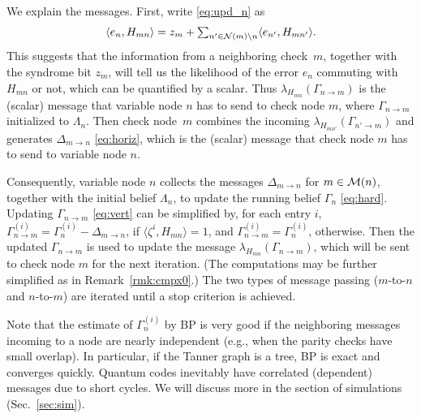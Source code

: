 \documentclass{ieeeaccess}
\newcommand{\sM}{{\cal M}}
\newcommand{\sN}{{\cal N}}
\theoremstyle{definition}		%
\begin{document}




We explain the messages. 
First, write \eqref{eq:upd_n} as
%
\begin{align*}	%
\langle e_n, H_{mn} \rangle = z_m + \textstyle \sum_{n'\in\sN(m)\setminus n} \langle e_{n'}, H_{mn'} \rangle.  %
\end{align*}
%
This suggests that the information from a neighboring check~$m$,  %
together with the syndrome bit $z_m$, will tell us the likelihood of the error $e_n$ commuting with $H_{mn}$ or not, which can be quantified by a scalar. 
Thus $\lambda_{H_{mn}}(\Gamma_{n\to m})$ is the (scalar) message that variable node $n$ has to send to check node $m$, where $\Gamma_{n\to m}$ initialized to $\Lambda_n$. 
Then check node~$m$ combines the incoming $\lambda_{H_{mn'}}(\Gamma_{n'\to m})$ and generates $\Delta_{m\to n}$ \eqref{eq:horiz}, which is the (scalar) message that check node $m$ has to send to variable node $n$.

Consequently,  variable node $n$ collects the messages $\Delta_{m\to n}$  for $m\in\sM(n)$, 
	together with the initial belief $\Lambda_n$, to update the running belief $\Gamma_{n}$ \eqref{eq:hard}. 
Updating $\Gamma_{n\to m}$ \eqref{eq:vert} can be simplified by, for each entry $i$, 
$\Gamma_{n\to m}^{(i)}=  \Gamma_{n}^{(i)}-\Delta_{m\to n}$, if $\langle\zeta^i,H_{mn}\rangle=1$, and 
$\Gamma_{n\to m}^{(i)}=  \Gamma_{n}^{(i)}$, otherwise.
Then the updated $\Gamma_{n\to m}$ is used to update the message $\lambda_{H_{mn}}(\Gamma_{n\to m})$, which will be sent to check node $m$ for the next iteration.
(The computations may be further simplified as in Remark~\ref{rmk:cmpx0}.)
The two types of message passing (\mbox{$m$-to-$n$} and \mbox{$n$-to-$m$}) are iterated until a stop criterion is achieved.


Note that the estimate of $\Gamma_{n}^{(i)}$ by BP is very good if the neighboring messages incoming to a node are nearly independent \cite[Sec~4.2]{Gal63} 
(e.g., when  the parity checks have small overlap).  
In particular, if the Tanner graph is a tree, BP is exact and converges quickly.
Quantum codes inevitably have correlated  {(dependent)} messages  {due to short cycles}.
%
We will discuss more in the section of simulations (Sec.~\ref{sec:sim}).
\end{document}
